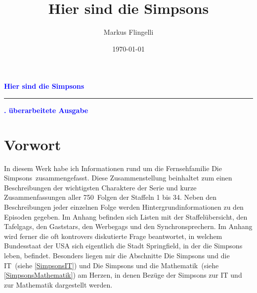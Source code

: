 \documentclass[pagesize,twoside,german]{scrbook}
\author{Markus Flingelli}
\date{\today}
\title{Hier sind die Simpsons}
\newcommand{\staffelAnzahl}{34}
\newcommand{\episodenAnzahl}{750}
\begin{document}
\setcounter{page}{1}

\def\datengerman{\def\today{\ifnum\day<10 0\fi\number\day.\ifnum\month<10 0\fi\number\month.\number\year}}

{}


\HTMLOutput{}
{
}

  
\HTMLOutput{
\maketitle
}
{
\vspace*{3ex}
\pagecolor{titleColor}\afterpage{\nopagecolor}
\vspace*{8cm}
\begin{flushleft}
  \Huge\textcolor{blue}{\textbf{\sffamily Hier sind die Simpsons}}\\
  \textcolor{blue}{\rule{\linewidth}{4pt}}
  \vspace{2ex}
  \huge\textcolor{blue}{\textbf{. überarbeitete Ausgabe}}
\end{flushleft}

\newpage
}

{}

\section*{Vorwort}
In diesem Werk habe ich Informationen rund um die Fernsehfamilie \glqq Die Simpsons\grqq\ zusammengefasst. Diese Zusammenstellung beinhaltet zum einen Beschreibungen der wichtigsten Charaktere der Serie und kurze Zusammenfassungen aller \episodenAnzahl\ Folgen der Staffeln 1 bis \staffelAnzahl . Neben den Beschreibungen jeder einzelnen Folge werden Hintergrundinformationen zu den Episoden gegeben. Im Anhang befinden sich Listen mit der Staffelübersicht, den Tafelgags, den Gaststars, den Werbegags und den Synchronsprechern. Im Anhang wird ferner die oft kontrovers diskutierte Frage beantwortet, in welchem Bundesstaat der USA sich eigentlich die Stadt Springfield, in der die Simpsons leben, befindet. Besonders liegen mir die Abschnitte \glqq Die Simpsons und die IT\grqq\ (siehe \ref{SimpsonsIT}) und \glqq Die Simpsons und die Mathematik\grqq\ (siehe \ref{SimpsonsMathematik}) am Herzen, in denen Bezüge der Simpsons zur IT und zur Mathematik dargestellt werden.
\end{document}
